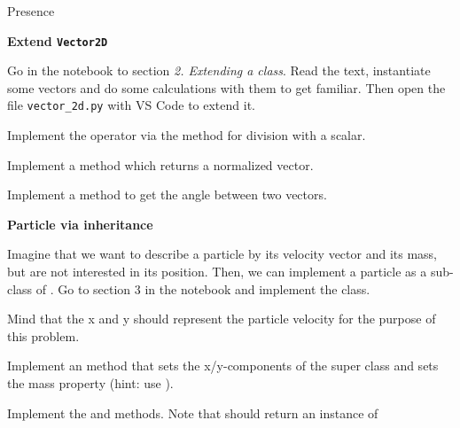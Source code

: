 \documentclass[a4paper, draft=False]{scrartcl}
\begin{document}
\begin{exam}[Presence]{Presence}
\begin{instructions}
\begin{problem*}
\begin{parts}
      \end{parts}
    \end{problem*}
    \begin{problem*}\textbf{Extend \texttt{Vector2D}}

      Go in the notebook to section \emph{2. Extending a class}. Read the text,
      instantiate some vectors and do some calculations with them to get
      familiar. Then open the file \texttt{vector\_2d.py} with VS Code to extend
      it.

      \begin{parts}
      \item Implement the \py{/} operator via the  method for
        division with a scalar.
      \item Implement a  method which returns a normalized vector.
      \item Implement a method  to get the angle between two vectors.
      \end{parts}
    \end{problem*}

    \begin{problem*}\textbf{Particle via inheritance}

      Imagine that we want to describe a particle by its velocity vector and its
      mass, but are not interested in its position. Then, we can implement a
      particle as a sub-class of . Go to section 3 in the notebook
      and implement the  class.

        Mind that the x and y should represent the particle velocity for the
        purpose of this problem.

    \begin{parts}
      \item Implement an  method that sets the
        x/y-components of the super class and sets the mass property
        (hint: use ).
      \item Implement the  and  methods. Note that
         should return an instance of 
    \end{parts}
    \end{problem*}
  \end{instructions}
\end{exam}
\end{document}
